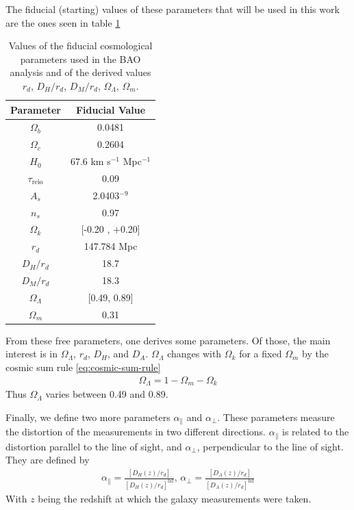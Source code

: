 The fiducial (starting) values of these parameters that will be used in this work are the ones seen in table \ref{tab:fid-values}
\begin{table}[t]
\begin{center}
\begin{tabular}{|c|c|}
\hline
Parameter & Fiducial Value \\
\hline
$\Omega_b$ & 0.0481 \\
$\Omega_c$ & 0.2604 \\
$H_0$ & 67.6 km s$^{-1}$ Mpc$^{-1}$ \\
$\tau_{\text{reio}}$ & 0.09 \\
$A_s$ & 2.0403\cdot 10$^{-9}$ \\
$n_s$ & 0.97 \\
$\Omega_k$ & [-0.20 , +0.20]  \\
\hline
\hline
$r_d$ & 147.784 Mpc \\
$D_H/r_d$ & 18.7 \\
$D_M/r_d$ & 18.3 \\
$\Omega_\Lambda$ & [0.49, 0.89] \\
$\Omega_m$ & 0.31  \\
\hline
\end{tabular}
\end{center}
\caption{Values of the fiducial cosmological parameters used in the BAO analysis and of the derived values $r_d$, $D_H / r_d$, $D_M /r_d$, $\Omega_\Lambda$, $\Omega_m$.}
\label{tab:fid-values}
\end{table}
From these free parameters, one derives some parameters. Of those, the main interest is in $\Omega_\Lambda$, $r_d$, $D_H$, and $D_A$. $\Omega_\Lambda$ changes with $\Omega_k$ for a fixed $\Omega_m$ by the cosmic sum rule \eqref{eq:cosmic-sum-rule}
\begin{align}
	\Omega_\Lambda =  1 - \Omega_m - \Omega_k
\end{align}
Thus $\Omega_\Lambda$ varies between 0.49 and 0.89.

Finally, we define two more parameters $\alpha_\parallel$ and $\alpha_\perp$. These parameters measure the distortion of the measurements in two different directions. $\alpha_\parallel$ is related to the distortion parallel to the line of sight, and  $\alpha_\perp$, perpendicular to the line of sight. They are defined by 
\begin{align}
	\alpha_\parallel = \frac{\left[ D_H(z) /r_d \right] }{\left[ D_H(z)/r_d \right]^{\text{fid}} }, \, \alpha_\perp = \frac{\left[ D_A(z) /r_d \right] }{\left[ D_A(z)/r_d \right]^{\text{fid}} }
	\label{eq:alphas-def}
\end{align}
With $z$ being the redshift at which the galaxy measurements were taken.
